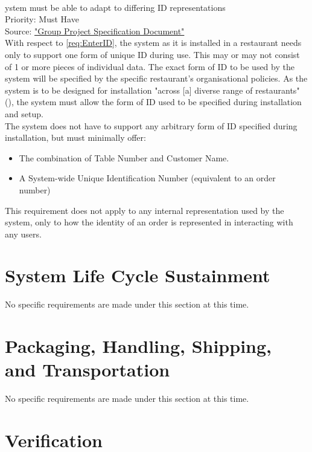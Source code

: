 \documentclass[11pt, a4paper]{report}
\def\itempar#1\\{\item \textbf{#1}\\} %
\begin{document}
\begin{enumerate}[resume*=nonfunctional]
\itempar System must be able to adapt to differing ID representations\\
Priority: Must Have\\
Source: \href{http://www.macs.hw.ac.uk/~rpp6/teaching/GroupProject/docs/project/GroupProjectSpec2017.pdf}{"Group Project Specification Document"}
\\
With respect to \autoref{req:EnterID}, the system as it is installed in a restaurant needs only to support one form of unique ID during use. This may or may not consist of 1 or more pieces of individual data. The exact form of ID to be used by the system will be specified by the specific restaurant's organisational policies. As the system is to be designed for installation "across [a] diverse range of restaurants" (\cite{Specification}), the system must allow the form of ID used to be specified during installation and setup.\\
The system does not have to support any arbitrary form of ID specified during installation, but must minimally offer:
\begin{itemize}
\item The combination of Table Number and Customer Name.
\item A System-wide Unique Identification Number (equivalent to an order number)
\end{itemize}
This requirement does not apply to any internal representation used by the system, only to how the identity of an order is represented in interacting with any users.
\end{enumerate}

\section{System Life Cycle Sustainment}

No specific requirements are made under this section at this time.

\section{Packaging, Handling, Shipping, and Transportation}

No specific requirements are made under this section at this time.

\section{Verification}
\end{document}
